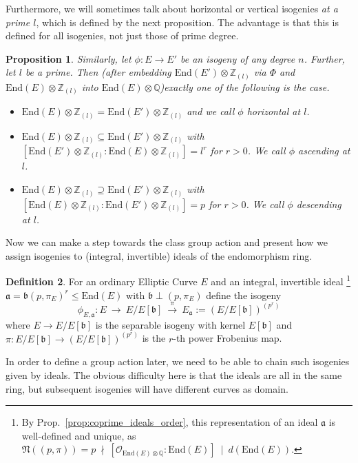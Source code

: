 \documentclass{ociamthesis}
\newcommand{\Z}{\mathbb{Z}}
\newcommand{\Q}{\mathbb{Q}}
\newcommand{\End}{\mathrm{End}}
\newcommand{\divides}{\ \mid \ }
\newcommand{\notdivides}{\ \nmid \ }
\newcommand{\Norm}{\mathfrak{N}}
\renewcommand{\a}{\mathfrak{a}}
\renewcommand{\b}{\mathfrak{b}}
\renewcommand{\O}{\mathcal{O}}
\newtheorem{prop}{Proposition}[section]
\theoremstyle{definition}
\newtheorem{definition}[prop]{Definition}
\begin{document}
Furthermore, we will sometimes talk about horizontal or vertical isogenies \emph{at a prime $l$}, which is defined by the next proposition.
The advantage is that this is defined for all isogenies, not just those of prime degree.
\begin{prop}
    Similarly, let $\phi: E \to E'$ be an isogeny of any degree $n$.
    Further, let $l$ be a prime.
    Then (after embedding $\End(E') \otimes \Z_{(l)}$ via $\Phi$ and $\End(E) \otimes \Z_{(l)}$ into $\End(E) \otimes \Q$)exactly one of the following is the case.
    \begin{itemize}
        \item $\End(E) \otimes \Z_{(l)} = \End(E') \otimes \Z_{(l)}$ and we call $\phi$ \emph{horizontal at $l$}.
        \item $\End(E) \otimes \Z_{(l)} \subseteq \End(E') \otimes \Z_{(l)}$ with $[\End(E') \otimes \Z_{(l)} : \End(E) \otimes \Z_{(l)}] = l^r$ for $r > 0$. We call $\phi$ \emph{ascending at $l$}.
        \item $\End(E) \otimes \Z_{(l)} \supseteq \End(E') \otimes \Z_{(l)}$ with $[\End(E) \otimes \Z_{(l)} : \End(E') \otimes \Z_{(l)}] = p$ for $r > 0$. We call $\phi$ \emph{descending at $l$}.
    \end{itemize}
\end{prop}
Now we can make a step towards the class group action and present how we assign isogenies to (integral, invertible) ideals of the endomorphism ring.
\begin{definition}
    For an ordinary Elliptic Curve $E$ and an integral, invertible ideal
    \footnote{By Prop.~\ref{prop:coprime_ideals_order}, this representation of an ideal $\a$ is well-defined and unique, as $\Norm((p, \pi)) = p \notdivides [\O_{\End(E) \otimes \Q} : \End(E)] \divides d(\End(E))$.}
    $\a = \b(p, \pi_E)^r \leq \End(E)$ with $\b \perp (p, \pi_E)$ define the isogeny
    \begin{equation*}
        \phi_{E, \a}: E \ \longrightarrow \ E/E[\b] \ \overset{\pi}{\longrightarrow} \ E_\a := (E/E[\b])^{(p^r)}
    \end{equation*}
    where $E \to E/E[\b]$ is the separable isogeny with kernel $E[\b]$ and $\pi: E/E[\b] \to (E/E[\b])^{(p^r)}$ is the $r$-th power Frobenius map.
\end{definition}
In order to define a group action later, we need to be able to chain such isogenies given by ideals.
The obvious difficulty here is that the ideals are all in the same ring, but subsequent isogenies will have different curves as domain.
\end{document}
